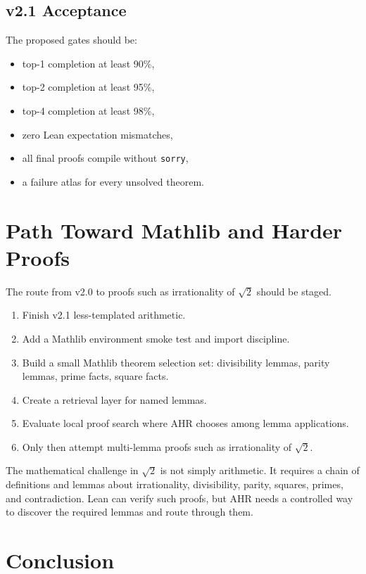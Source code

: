 \documentclass[11pt]{article}
\begin{document}
\subsection{v2.1 Acceptance}

The proposed gates should be:

\begin{itemize}
  \item top-1 completion at least 90\%,
  \item top-2 completion at least 95\%,
  \item top-4 completion at least 98\%,
  \item zero Lean expectation mismatches,
  \item all final proofs compile without \texttt{sorry},
  \item a failure atlas for every unsolved theorem.
\end{itemize}

\section{Path Toward Mathlib and Harder Proofs}

The route from v2.0 to proofs such as irrationality of $\sqrt{2}$ should be staged.

\begin{enumerate}
  \item Finish v2.1 less-templated arithmetic.
  \item Add a Mathlib environment smoke test and import discipline.
  \item Build a small Mathlib theorem selection set: divisibility lemmas, parity lemmas, prime facts, square facts.
  \item Create a retrieval layer for named lemmas.
  \item Evaluate local proof search where AHR chooses among lemma applications.
  \item Only then attempt multi-lemma proofs such as irrationality of $\sqrt{2}$.
\end{enumerate}

The mathematical challenge in $\sqrt{2}$ is not simply arithmetic. It requires a chain of definitions and lemmas about
irrationality, divisibility, parity, squares, primes, and contradiction. Lean can verify such proofs, but AHR needs a
controlled way to discover the required lemmas and route through them.

\section{Conclusion}
\end{document}
